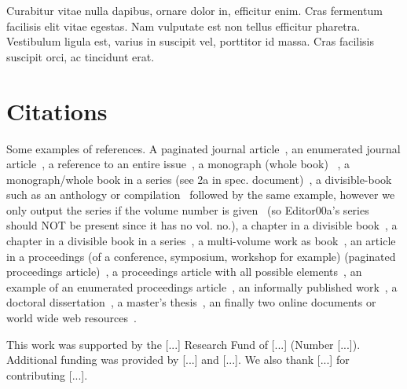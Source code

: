 \documentclass[sigconf, nonacm]{acmart}
\begin{document}
Curabitur vitae nulla dapibus, ornare dolor in, efficitur enim. Cras fermentum facilisis elit vitae egestas. Nam vulputate est non tellus efficitur pharetra. Vestibulum ligula est, varius in suscipit vel, porttitor id massa. Cras facilisis suscipit orci, ac tincidunt erat.

\section{Citations}

Some examples of references. A paginated journal article~\cite{Abril07}, an enumerated journal article~\cite{Cohen07}, a reference to an entire issue~\cite{JCohen96}, a monograph (whole book) ~\cite{Kosiur01}, a monograph/whole book in a series (see 2a in spec. document)~\cite{Harel79}, a divisible-book such as an anthology or compilation~\cite{Editor00} followed by the same example, however we only output the series if the volume number is given~\cite{Editor00a} (so Editor00a's series should NOT be present since it has no vol. no.), a chapter in a divisible book~\cite{Spector90}, a chapter in a divisible book in a series~\cite{Douglass98}, a multi-volume work as book~\cite{Knuth97}, an article in a proceedings (of a conference, symposium, workshop for example) (paginated proceedings article)~\cite{Andler79}, a proceedings article with all possible elements~\cite{Smith10}, an example of an enumerated proceedings article~\cite{VanGundy07}, an informally published work~\cite{Harel78}, a doctoral dissertation~\cite{Clarkson85}, a master's thesis~\cite{anisi03}, an finally two online documents or world wide web resources~\cite{Thornburg01, Ablamowicz07}.

\begin{acks}
 This work was supported by the [...] Research Fund of [...] (Number [...]). Additional funding was provided by [...] and [...]. We also thank [...] for contributing [...].
\end{acks}




\end{document}
